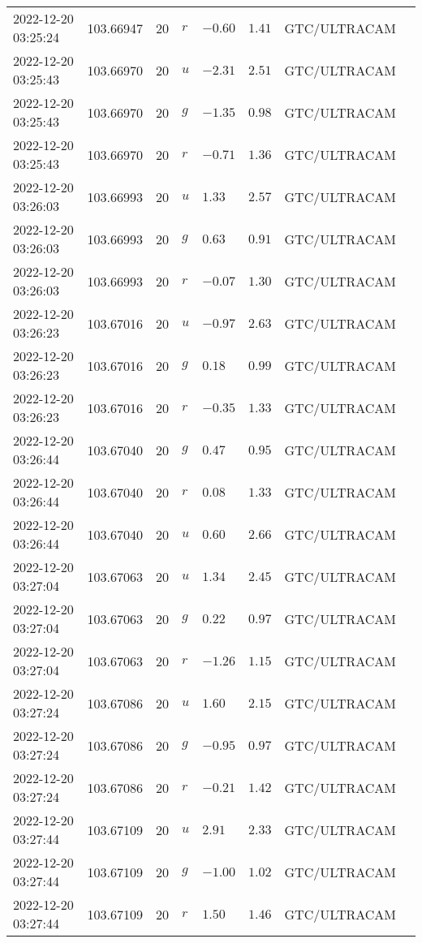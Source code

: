 \documentclass{nature_plusfigure}
\begin{document}
\begin{supplement}
\begin{center}
\begin{longtable}{llllllll}
2022-12-20 03:25:24 & 103.66947 & 20 & $r$ & $-0.60$ & $1.41$ & GTC/ULTRACAM &  \\ 
2022-12-20 03:25:43 & 103.66970 & 20 & $u$ & $-2.31$ & $2.51$ & GTC/ULTRACAM &  \\ 
2022-12-20 03:25:43 & 103.66970 & 20 & $g$ & $-1.35$ & $0.98$ & GTC/ULTRACAM &  \\ 
2022-12-20 03:25:43 & 103.66970 & 20 & $r$ & $-0.71$ & $1.36$ & GTC/ULTRACAM &  \\ 
2022-12-20 03:26:03 & 103.66993 & 20 & $u$ & $1.33$ & $2.57$ & GTC/ULTRACAM &  \\ 
2022-12-20 03:26:03 & 103.66993 & 20 & $g$ & $0.63$ & $0.91$ & GTC/ULTRACAM &  \\ 
2022-12-20 03:26:03 & 103.66993 & 20 & $r$ & $-0.07$ & $1.30$ & GTC/ULTRACAM &  \\ 
2022-12-20 03:26:23 & 103.67016 & 20 & $u$ & $-0.97$ & $2.63$ & GTC/ULTRACAM &  \\ 
2022-12-20 03:26:23 & 103.67016 & 20 & $g$ & $0.18$ & $0.99$ & GTC/ULTRACAM &  \\ 
2022-12-20 03:26:23 & 103.67016 & 20 & $r$ & $-0.35$ & $1.33$ & GTC/ULTRACAM &  \\ 
2022-12-20 03:26:44 & 103.67040 & 20 & $g$ & $0.47$ & $0.95$ & GTC/ULTRACAM &  \\ 
2022-12-20 03:26:44 & 103.67040 & 20 & $r$ & $0.08$ & $1.33$ & GTC/ULTRACAM &  \\ 
2022-12-20 03:26:44 & 103.67040 & 20 & $u$ & $0.60$ & $2.66$ & GTC/ULTRACAM &  \\ 
2022-12-20 03:27:04 & 103.67063 & 20 & $u$ & $1.34$ & $2.45$ & GTC/ULTRACAM &  \\ 
2022-12-20 03:27:04 & 103.67063 & 20 & $g$ & $0.22$ & $0.97$ & GTC/ULTRACAM &  \\ 
2022-12-20 03:27:04 & 103.67063 & 20 & $r$ & $-1.26$ & $1.15$ & GTC/ULTRACAM &  \\ 
2022-12-20 03:27:24 & 103.67086 & 20 & $u$ & $1.60$ & $2.15$ & GTC/ULTRACAM &  \\ 
2022-12-20 03:27:24 & 103.67086 & 20 & $g$ & $-0.95$ & $0.97$ & GTC/ULTRACAM &  \\ 
2022-12-20 03:27:24 & 103.67086 & 20 & $r$ & $-0.21$ & $1.42$ & GTC/ULTRACAM &  \\ 
2022-12-20 03:27:44 & 103.67109 & 20 & $u$ & $2.91$ & $2.33$ & GTC/ULTRACAM &  \\ 
2022-12-20 03:27:44 & 103.67109 & 20 & $g$ & $-1.00$ & $1.02$ & GTC/ULTRACAM &  \\ 
2022-12-20 03:27:44 & 103.67109 & 20 & $r$ & $1.50$ & $1.46$ & GTC/ULTRACAM &  \\ 

\end{longtable}
\end{center}
\end{supplement}
\end{document}
